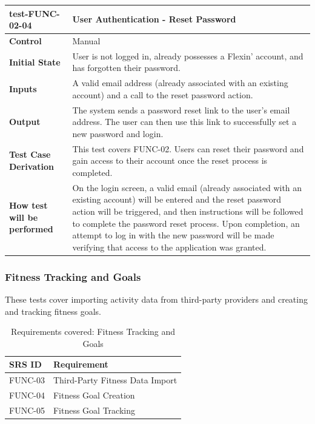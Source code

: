 \documentclass[12pt, titlepage]{article}
\begin{document}
\vspace{1em}

\noindent\begin{tabularx}{\textwidth}{>{\raggedright\arraybackslash}p{3.5cm}X}
  \toprule
  \textbf{test-FUNC-02-04} & \textbf{User Authentication - Reset Password}\\
  \midrule
  \textbf{Control} & Manual\\
  \textbf{Initial State} & User is not logged in, already possesses a Flexin' account, and has forgotten their password.\\
  \textbf{Inputs} & A valid email address (already associated with an existing account) and a call to the reset password action.\\
  \textbf{Output} & The system sends a password reset link to the user's email address. The user can then use this link to successfully set a new password and login.\\
  \textbf{Test Case Derivation} & This test covers FUNC-02. Users can reset their password and gain access to their account once the reset process is completed.\\
  \textbf{How test will be performed} & On the login screen, a valid email (already associated with an existing account) will be entered and the reset password action will be triggered, and then instructions will be followed to complete the password reset process. Upon completion, an attempt to log in with the new password will be made verifying that access to the application was granted.\\
  \bottomrule
\end{tabularx}


\subsubsection{Fitness Tracking and Goals}

These tests cover importing activity data from third-party providers and creating and tracking fitness goals.

\begin{table}[H]
  \caption{Requirements covered: Fitness Tracking and Goals}
  \noindent\begin{tabularx}{\textwidth}{p{3cm}X}
  \toprule
  \textbf{SRS ID} & \textbf{Requirement} \\
  \midrule
  FUNC-03 & Third-Party Fitness Data Import \\
  FUNC-04 & Fitness Goal Creation \\
  FUNC-05 & Fitness Goal Tracking \\
  \bottomrule
\end{tabularx}
\end{table}
\end{document}

